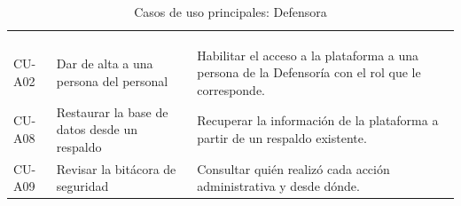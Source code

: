 \small
\renewcommand{\arraystretch}{1.2}
\setlength{\tabcolsep}{4pt}
\begin{longtable}{|L{1.8cm}|L{4.6cm}|L{9.2cm}|}
	\hiderowcolors\caption{Casos de uso principales: Defensora}
	\label{tab:cu_admin} \\ \showrowcolors
	\hline
	 &  &  \\
	\hline
	\endfirsthead
	\hline
	 &  &  \\
	\hline
	\endhead
	CU-A02 & Dar de alta a una persona del personal & Habilitar el acceso a la plataforma a una persona de la Defensoría con el rol que le corresponde. \\ \hline
	CU-A08 & Restaurar la base de datos desde un respaldo & Recuperar la información de la plataforma a partir de un respaldo existente. \\ \hline
	CU-A09 & Revisar la bitácora de seguridad & Consultar quién realizó cada acción administrativa y desde dónde. \\ \hline
\end{longtable}
\normalsize
\setlength{\tabcolsep}{6pt}
\renewcommand{\arraystretch}{1}


